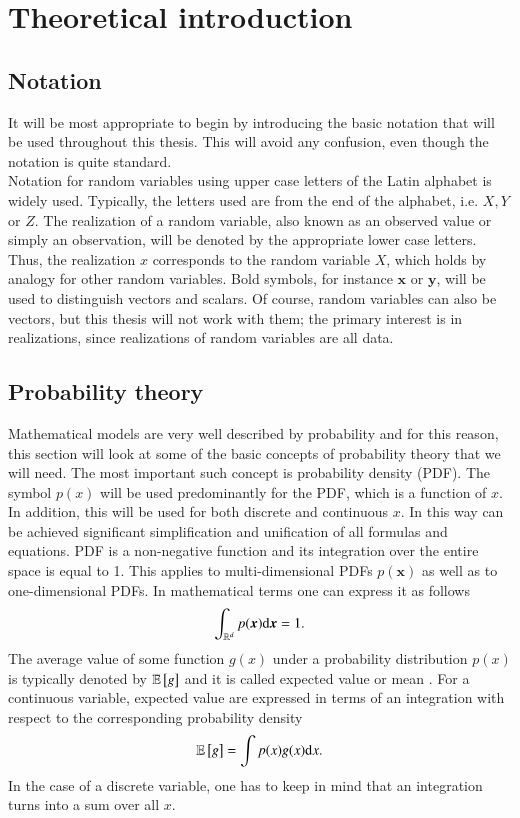 \chapter{Theoretical introduction}

\section{Notation}\label{sec:terminology}
It will be most appropriate to begin by introducing the basic notation that will be used throughout this thesis. This will avoid any confusion, even though the notation is quite standard. \\
Notation for random variables using upper case letters of the Latin alphabet is widely used. Typically, the letters used are from the end of the alphabet, i.e. $X,Y$ or $Z$. The realization of a random variable, also known as an observed value or simply an observation, will be denoted by the appropriate lower case letters. Thus, the realization  $x$ corresponds to the random variable $X$, which holds by analogy for other random variables. Bold symbols, for instance $\boldsymbol{x}$ or $\boldsymbol{y}$, will be used to distinguish vectors and scalars. Of course, random variables can also be vectors, but this thesis will not work with them; the primary interest is in realizations, since realizations of random variables are all data. \\



\section{Probability theory}
Mathematical models are very well described by probability and for this reason, this section will look at some of the basic concepts of probability theory that we will need. The most important such concept is probability density (PDF). 
The symbol $p(x)$ will be used predominantly for the PDF, which is a function of $x$.  In addition, this will be used for both discrete and continuous $x$. In this way can be achieved significant simplification and unification of all formulas and equations. PDF is a non-negative function and its integration over the entire space is equal to 1. This applies to multi-dimensional PDFs $p(\boldsymbol{x})$ as well as to one-dimensional PDFs. In mathematical terms one can express it as follows
\begin{equation}
    \int_{\mathbb{R}^d}p(\boldsymbol{x})\mathrm{d}{\boldsymbol{x}} = 1.
\end{equation}
The average value of some function $g(x)$ under a probability distribution $p(x)$ is typically denoted by $\mathbb{E}\left[ g \right]$ and it is called expected value or mean \cite{bishop}. For a continuous variable, expected value are expressed in terms of an integration with respect to the corresponding probability density
\begin{equation}
	\mathbb{E}\left[ g \right] = \int p(x)g(x)\mathrm{d}{x}.
\end{equation} 
In the case of a discrete variable, one has to keep in mind that an integration turns into a sum over all $x$.   \\

